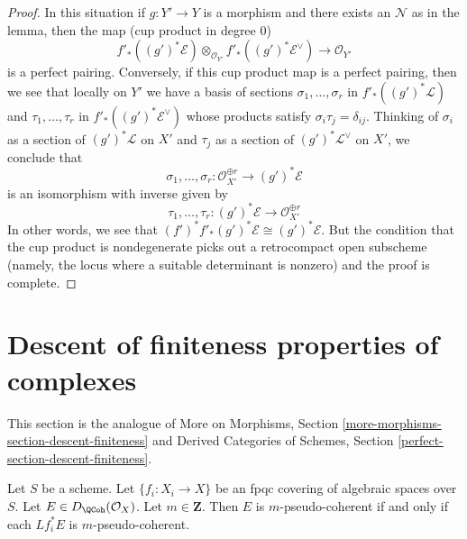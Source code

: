\begin{proof}
\medskip\noindent
In this situation if $g : Y' \to Y$ is a morphism and there exists an
$\mathcal{N}$ as in the lemma, then the map (cup product in degree $0$)
$$
f'_*((g')^*\mathcal{E})
\otimes_{\mathcal{O}_{Y'}}
f'_*((g')^*\mathcal{E}^\vee)
\longrightarrow \mathcal{O}_{Y'}
$$
is a perfect pairing. Conversely, if this cup product map is a
perfect pairing, then we see that locally on $Y'$ we have
a basis of sections
$\sigma_1, \ldots, \sigma_r$ in $f'_*((g')^*\mathcal{L})$ and
$\tau_1, \ldots, \tau_r$ in
$f'_*((g')^*\mathcal{E}^\vee)$ whose products satisfy
$\sigma_i \tau_j = \delta_{ij}$. Thinking of $\sigma_i$
as a section of $(g')^*\mathcal{L}$ on $X'$
and $\tau_j$ as a section of $(g')^*\mathcal{L}^\vee$ on $X'$,
we conclude that
$$
\sigma_1, \ldots, \sigma_r :
\mathcal{O}_{X'}^{\oplus r}
\longrightarrow
(g')^*\mathcal{E}
$$
is an isomorphism with inverse given by
$$
\tau_1, \ldots, \tau_r :
(g')^*\mathcal{E}
\longrightarrow
\mathcal{O}_{X'}^{\oplus r}
$$
In other words, we see that
$(f')^*f'_*(g')^*\mathcal{E} \cong (g')^*\mathcal{E}$.
But the condition that the cup product is nondegenerate
picks out a retrocompact open subscheme (namely, the locus where a suitable
determinant is nonzero) and the proof is complete.
\end{proof}









\section{Descent of finiteness properties of complexes}
\label{section-descent-finiteness}

\noindent
This section is the analogue of More on Morphisms,
Section \ref{more-morphisms-section-descent-finiteness}
and
Derived Categories of Schemes, Section
\ref{perfect-section-descent-finiteness}.

\begin{lemma}
\label{lemma-pseudo-coherent-descends-fpqc}
Let $S$ be a scheme. Let $\{f_i : X_i \to X\}$ be an fpqc covering of
algebraic spaces over $S$. Let $E \in D_\QCoh(\mathcal{O}_X)$.
Let $m \in \mathbf{Z}$. Then $E$ is $m$-pseudo-coherent if and only if each
$Lf_i^*E$ is $m$-pseudo-coherent.
\end{lemma}

